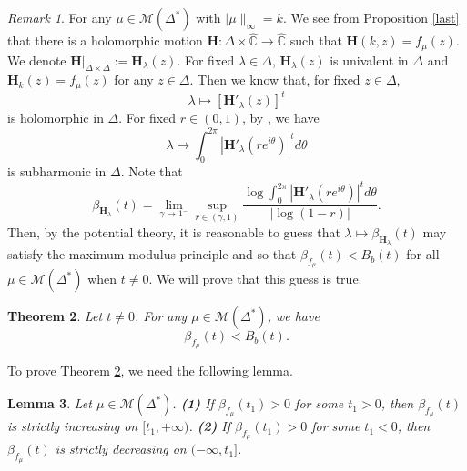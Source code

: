 \documentclass[11pt]{amsart}
\newtheorem{theorem}{Theorem}[section]
\newtheorem{lemma}[theorem]{Lemma}
\theoremstyle{remark}
\newtheorem{remark}[theorem]{Remark}
\theoremstyle{claim}
\theoremstyle{definition}
\theoremstyle{problem}
\theoremstyle{conjecture}
\theoremstyle{question}
\numberwithin{equation}{section}
\begin{document}
\begin{remark}\label{frem}  For any $\mu\in \mathcal{M}(\Delta^{*})$ with $|\mu\|_{\infty}=k$.  We see from Proposition \ref{last} that there is a holomorphic motion $\mathbf{H}: \Delta \times \widehat{\mathbb{C}} \rightarrow \widehat{\mathbb{C}}$ such that $\mathbf{H}(k, z)=f_{\mu}(z)$. We denote $\mathbf{H}|_{\Delta\times \Delta}:={\mathbf{H}}_{\lambda}(z)$. For fixed $\lambda\in \Delta$, ${\mathbf{H}}_{\lambda}(z)$ is univalent in $\Delta$ and ${\mathbf{H}}_{k}(z)=f_{\mu}(z)$ for any $z\in \Delta$. Then we know that, for fixed $z\in \Delta$,
$$\lambda  \mapsto  [{\mathbf{H}}'_{\lambda}(z)]^t$$
is holomorphic in $\Delta$. For fixed $r\in (0,1)$, by \cite[Theorem 2.4.8]{Ran}, we have
$$\lambda  \mapsto \int_{0}^{2\pi}|{\mathbf{H}}'_{\lambda}(re^{i\theta})|^t d\theta$$
is subharmonic in $\Delta$. Note that
$$\beta_{{\mathbf{H}}_{\lambda}}(t)=\lim\limits_{\gamma\rightarrow 1^{-}} \sup\limits_{r\in (\gamma,1)}\frac{\log \int_{0}^{2\pi}|{\mathbf{H}}'_{\lambda}(re^{i\theta})|^td\theta}{|\log(1-r)|}.$$
Then, by the potential theory,  it is reasonable to guess that $\lambda \mapsto \beta_{{\mathbf{H}}_{\lambda}}(t)$ may satisfy the maximum modulus principle and so that $\beta_{f_{\mu}}(t)<B_b(t)$
for all $\mu \in \mathcal{M}(\Delta^{*})$ when $t\neq 0$. We will prove that this guess is true. 
\end{remark}
\begin{theorem}\label{main-f}
Let $t\neq 0$. For any $\mu\in \mathcal{M}(\Delta^{*})$, we have 
\begin{equation}\label{m-est}
\beta_{f_{\mu}}(t)<B_b(t).
\end{equation}
 \end{theorem}
 
To prove Theorem \ref{main-f}, we need the following lemma. 
\begin{lemma}\label{m-l}
Let $\mu\in \mathcal{M}(\Delta^{*})$. {\bf (1)} If $\beta_{f_{\mu}}(t_1)>0$ for some $t_1>0$,  then $\beta_{f_{\mu}}(t)$ is strictly increasing on $[t_1, +\infty)$. 
 {\bf (2)} If $\beta_{f_{\mu}}(t_1)>0$ for some $t_1<0$,  then $\beta_{f_{\mu}}(t)$ is strictly decreasing on $(-\infty, t_1]$. 
\end{lemma}
\end{document}
